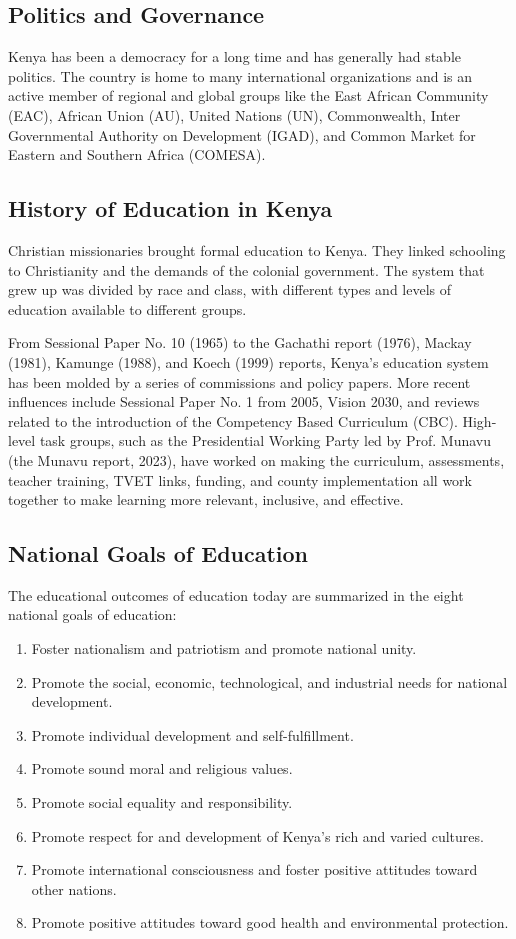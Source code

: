 \documentclass[12pt,a4paper]{article}
\begin{document}
\subsection*{Politics and Governance}
Kenya has been a democracy for a long time and has generally had stable politics. The country is home to many international organizations and is an active member of regional and global groups like the East African Community (EAC), African Union (AU), United Nations (UN), Commonwealth, Inter Governmental Authority on Development (IGAD), and Common Market for Eastern and Southern Africa (COMESA).

\subsection*{History of Education in Kenya}
Christian missionaries brought formal education to Kenya. They linked schooling to Christianity and the demands of the colonial government. The system that grew up was divided by race and class, with different types and levels of education available to different groups.

From Sessional Paper No. 10 (1965) to the Gachathi report (1976), Mackay (1981), Kamunge (1988), and Koech (1999) reports, Kenya's education system has been molded by a series of commissions and policy papers. More recent influences include Sessional Paper No. 1 from 2005, Vision 2030, and reviews related to the introduction of the Competency Based Curriculum (CBC). High-level task groups, such as the Presidential Working Party led by Prof. Munavu (the Munavu report, 2023), have worked on making the curriculum, assessments, teacher training, TVET links, funding, and county implementation all work together to make learning more relevant, inclusive, and effective.

\subsection*{National Goals of Education}
The educational outcomes of education today are summarized in the eight national goals of education:
\begin{enumerate}
    \item Foster nationalism and patriotism and promote national unity.
    \item Promote the social, economic, technological, and industrial needs for national development.
    \item Promote individual development and self-fulfillment.
    \item Promote sound moral and religious values.
    \item Promote social equality and responsibility.
    \item Promote respect for and development of Kenya’s rich and varied cultures.
    \item Promote international consciousness and foster positive attitudes toward other nations.
    \item Promote positive attitudes toward good health and environmental protection.
\end{enumerate}
\end{document}
